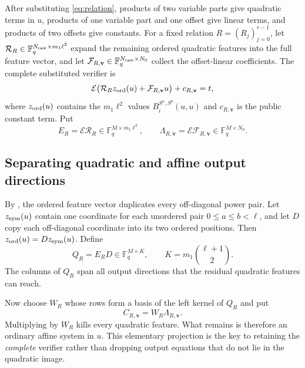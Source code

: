 \documentclass[11pt]{article}
\newcommand{\F}{\mathbb F}
\begin{document}
After substituting \eqref{eq:relation}, products of two variable parts give
quadratic terms in $u$, products of one variable part and one offset give
linear terms, and products of two offsets give constants.  For a fixed
relation $R=(R_j)_{j=0}^{r-1}$, let
$\mathcal R_R\in\F_q^{N_{\rm raw}\times m_1\ell^2}$ expand the remaining ordered
quadratic features into the full feature vector, and let
$\mathcal F_{R,\mathbf v}\in\F_q^{N_{\rm raw}\times N_0}$ collect the offset-linear
coefficients.  The complete substituted verifier is
\begin{equation}\label{eq:ordered-system}
 \mathcal E\bigl(\mathcal R_Rz_{\rm ord}(u)+\mathcal F_{R,\mathbf v}u\bigr)
 +c_{R,\mathbf v}=t,
\end{equation}
where $z_{\rm ord}(u)$ contains the $m_1\ell^2$ values
$B_i^{S^a,S^b}(u,u)$ and $c_{R,\mathbf v}$ is the public constant term.  Put
\begin{equation}\label{eq:ER}
 E_R=\mathcal E\mathcal R_R\in\F_q^{M\times m_1\ell^2},
 \qquad \Lambda_{R,\mathbf v}=\mathcal E\mathcal F_{R,\mathbf v}\in\F_q^{M\times N_0}.
\end{equation}

\subsection{Separating quadratic and affine output directions}

By , the ordered feature vector duplicates every
off-diagonal power pair.  Let $z_{\rm sym}(u)$ contain one coordinate for each
unordered pair $0\le a\le b<\ell$, and let $D$ copy each off-diagonal
coordinate into its two ordered positions.  Then
$z_{\rm ord}(u)=Dz_{\rm sym}(u)$.  Define
\begin{equation}\label{eq:QR}
 Q_R=E_RD\in\F_q^{M\times K},
 \qquad K=m_1\binom{\ell+1}{2}.
\end{equation}
The columns of $Q_R$ span all output directions that the residual quadratic
features can reach.

Now choose $W_R$ whose rows form a basis of the left kernel of $Q_R$ and put
\begin{equation}\label{eq:C}
 C_{R,\mathbf v}=W_R\Lambda_{R,\mathbf v}.
\end{equation}
Multiplying by $W_R$ kills every quadratic feature.  What remains is therefore
an ordinary affine system in $u$.  This elementary projection is the key to
retaining the \emph{complete} verifier rather than dropping output equations
that do not lie in the quadratic image.
\end{document}
